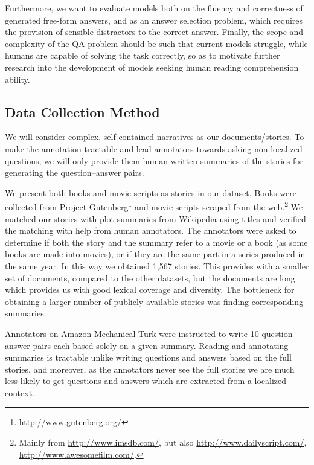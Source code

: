 \documentclass[11pt,letterpaper]{article}
\begin{document}
Furthermore, we want to evaluate models both on the fluency and correctness of generated free-form answers, and as an answer selection problem, which requires the provision of sensible distractors to the correct answer. Finally, the scope and complexity of the QA problem should be such that current models struggle, while humans are capable of solving the task correctly, so as to motivate further research into the development of models seeking human reading comprehension ability.


\subsection{Data Collection Method}

We will consider complex, self-contained narratives as our documents/stories. To make the annotation tractable and lead annotators towards asking non-localized questions, we will only provide them human written summaries of the stories for generating the question--answer pairs.

We present both books and movie scripts as stories in our dataset. Books were collected from Project Gutenberg\footnote{\url{http://www.gutenberg.org/}} and movie scripts scraped from the web.\footnote{Mainly from \url{http://www.imsdb.com/}, but also \url{http://www.dailyscript.com/}, \url{http://www.awesomefilm.com/}.}
We matched our stories with plot summaries from Wikipedia using titles and verified the matching with help from human annotators. The annotators were asked to determine if both the story and the summary refer to a movie or a book (as some books are made into movies), or if they are the same part in a series produced in the same year. In this way we obtained 1,567 stories. This provides with a smaller set of documents, compared to the other datasets, but the documents are long which provides us with good lexical coverage and diversity. The bottleneck for obtaining a larger number of publicly available stories was finding corresponding summaries.

Annotators on Amazon Mechanical Turk were instructed to write 10 question--answer pairs each based solely on a given summary.
Reading and annotating summaries is tractable unlike writing questions and answers based on the full stories, and moreover, as the annotators never see the full stories we are much less likely to get questions and answers which are extracted from a localized context.
\end{document}
